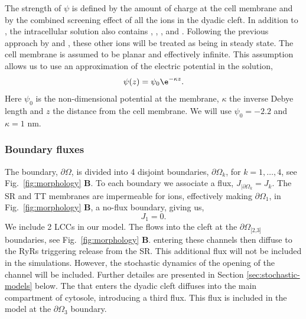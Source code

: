 The strength of $\psi$ is defined by the amount of charge at the cell membrane and by the combined screening effect of all the ions in the dyadic cleft. In addition to \Ca, the intracellular solution also contains \K, \Na, \Cl, and \Mg. Following the previous approach by \citet{LangnerCafisoEtAl1990} and \citet{SoellerCannell1997}, these other ions will be treated as being in steady state. The cell membrane is assumed to be planar and effectively infinite. This assumption allows us to use an approximation of the electric potential in the solution,
\begin{equation}
  \label{eq:electric_potential}
  \psi(z) = \psi_0\e^{-\kappa{}z}.
\end{equation}
Here $\psi_0$ is the non-dimensional potential at the membrane, $\kappa$ the inverse Debye length and $z$ the distance from the cell membrane. We will use $\psi_0=-2.2$ and $\kappa=1$ nm.\par

\subsubsection*{Boundary fluxes}

The boundary, $\partial\Omega$, is divided into 4 disjoint boundaries, $\partial\Omega_k$, for $k=1,\ldots,4$, see Fig.~\ref{fig:morphology} \textbf{B}. To each boundary we associate a flux, $J_{|\partial\Omega_k}=J_k$. The SR and TT membranes are impermeable for ions, effectively making $\partial\Omega_{\scriptscriptstyle\text{1}}$, in Fig.~\ref{fig:morphology} \textbf{B}, a no-flux boundary, giving us,
\begin{equation}
  \label{eq:no-flux}
  J_{\scriptscriptstyle 1}= 0.
\end{equation}
We include 2 LCCs in our model. The \Ca flows into the cleft at the $\partial\Omega_{\scriptscriptstyle\text{[2,3]}}$ boundaries, see Fig.~\ref{fig:morphology} \textbf{B}. \Ca entering these channels then diffuse to the RyRs triggering \Ca release from the SR. This additional \Ca flux will not be included in the simulations. However, the stochastic dynamics of the opening of the channel will be included. Further detailes are presented in Section \ref{sec:stochastic-models} below. The \Ca that enters the dyadic cleft diffuses into the main compartment of cytosole, introducing a third flux. This flux is included in the model at the $\partial\Omega_{\scriptscriptstyle\text{3}}$ boundary.\par


